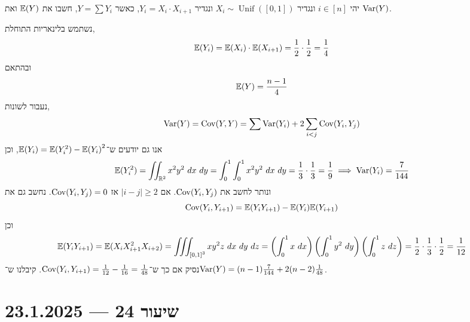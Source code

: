 \begin{exercise}
	יהי $i \in [n]$ ונגדיר $X_i \sim \operatorname{Unif}([0, 1])$ ונגדיר $Y_i = X_i \cdot X_{i + 1}$, כאשר $Y = \sum Y_i$,
	חשבו את $\mathbb{E}(Y)$ ואת $\operatorname{Var}(Y)$.
\end{exercise}
\begin{solution}
	נשתמש בלינאריות התוחלת,
	\[
		\mathbb{E}(Y_i)
		= \mathbb{E}(X_i) \cdot \mathbb{E}(X_{i + 1})
		= \frac{1}{2} \cdot \frac{1}{2}
		= \frac{1}{4}
	\]
	ובהתאם
	\[
		\mathbb{E}(Y)
		= \frac{n - 1}{4}
	\]
	נעבור לשונות,
	\[
		\operatorname{Var}(Y)
		= \operatorname{Cov}(Y, Y)
		= \sum \operatorname{Var}(Y_i) + 2 \sum_{i < j} \operatorname{Cov}(Y_i, Y_j)
	\]
	אנו גם יודעים ש־$\mathbb{E}(Y_i) = \mathbb{E}(Y_i^2) - {\mathbb{E}(Y_i)}^2$, וכן
	\[
		\mathbb{E}(Y_i^2)
		= \iint_{\mathbb{R}^2} x^2 y^2\ dx\ dy
		= \int_0^1 \int_0^1 x^2 y^2\ dx\ dy
		= \frac{1}{3} \cdot \frac{1}{3}
		= \frac{1}{9}
		\implies \operatorname{Var}(Y_i)
		= \frac{7}{144}
	\]
	ונותר לחשב את $\operatorname{Cov}(Y_i, Y_j)$. אם $|i - j| \ge 2$ אז $\operatorname{Cov}(Y_i, Y_j) = 0$.
	נחשב גם את
	\[
		\operatorname{Cov}(Y_i, Y_{i + 1})
		= \mathbb{E}(Y_i Y_{i + 1}) - \mathbb{E}(Y_i) \mathbb{E}(Y_{i + 1})
	\]
	וכן
	\[
		\mathbb{E}(Y_i Y_{i + 1})
		= \mathbb{E}(X_i X_{i + 1}^2 X_{i + 2})
		= \iiint_{{[0, 1]}^3} x y^2 z\ dx\ dy\ dz
		= \left( \int_0^1 x\ dx \right) \left( \int_0^1 y^2\ dy \right) \left( \int_0^1 z\ dz \right)
		= \frac{1}{2} \cdot \frac{1}{3} \cdot \frac{1}{2}
		= \frac{1}{12}
	\]
	נסיק אם כך ש־$\operatorname{Cov}(Y_i, Y_{i + 1}) = \frac{1}{12} - \frac{1}{16} = \frac{1}{48}$.
	קיבלנו ש־$\operatorname{Var}(Y) = (n - 1) \frac{7}{144} + 2(n - 2) \frac{1}{48}$.
\end{solution}

\section{שיעור 24 --- 23.1.2025}
